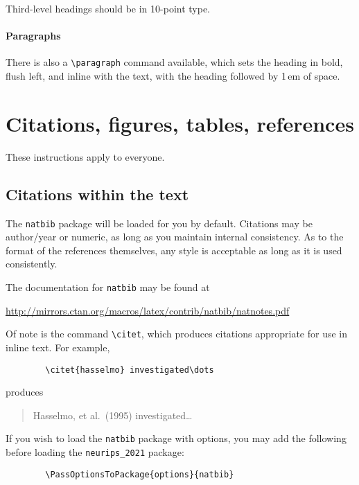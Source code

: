 \documentclass{article}
\begin{document}
	Third-level headings should be in 10-point type.
	
	\paragraph{Paragraphs}
	
	There is also a \verb+\paragraph+ command available, which sets the heading in
	bold, flush left, and inline with the text, with the heading followed by 1\,em
	of space.
	
	\section{Citations, figures, tables, references}
	\label{others}
	
	These instructions apply to everyone.
	
	\subsection{Citations within the text}
	
	The \verb+natbib+ package will be loaded for you by default.  Citations may be
	author/year or numeric, as long as you maintain internal consistency.  As to the
	format of the references themselves, any style is acceptable as long as it is
	used consistently.
	
	The documentation for \verb+natbib+ may be found at
	\begin{center}
		\url{http://mirrors.ctan.org/macros/latex/contrib/natbib/natnotes.pdf}
	\end{center}
	Of note is the command \verb+\citet+, which produces citations appropriate for
	use in inline text.  For example,
	\begin{verbatim}
		\citet{hasselmo} investigated\dots
	\end{verbatim}
	produces
	\begin{quote}
		Hasselmo, et al.\ (1995) investigated\dots
	\end{quote}
	
	If you wish to load the \verb+natbib+ package with options, you may add the
	following before loading the \verb+neurips_2021+ package:
	\begin{verbatim}
		\PassOptionsToPackage{options}{natbib}
	\end{verbatim}
	
\end{document}
